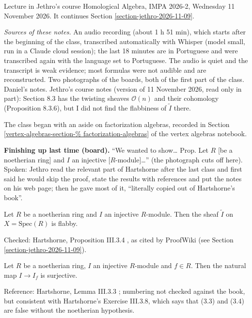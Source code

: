 \medskip
Lecture in Jethro's course Homological
Algebra, IMPA 2026-2, Wednesday 11 November
2026. It continues Section
\ref{section-jethro-2026-11-09}.

\textit{Sources of these notes.} An audio
recording (about 1 h 51 min), which starts
after the beginning of the class,
transcribed automatically with Whisper
(model small, run in a Claude cloud
session); the last 18 minutes are in
Portuguese and were transcribed again with
the language set to Portuguese. The audio
is quiet and the transcript is weak
evidence; most formulas were not audible
and are reconstructed. Two photographs of
the boards, both of the first part of the
class. Daniel's notes. Jethro's course notes
\cite{vanEkerenHomologicalAlgebra2026}
(version of 11 November 2026, read only in
part): Section 8.3 has the twisting sheaves
$\mathcal{O}(n)$ and their cohomology
(Proposition 8.3.6), but I did not find the
flabbiness of $\widetilde{I}$ there.

The class began with an aside on
factorization algebras, recorded in Section
\ref{vertex-algebras-section-%
factorization-algebras}
of the vertex algebras notebook.

\medskip\noindent
{\bf Finishing up last time (board).} ``We
wanted to show\ldots{} Prop. Let $R$ [be a
noetherian ring] and $I$ an injective
[$R$-module]\ldots'' (the photograph cuts
off here). Spoken: Jethro read the relevant
part of Hartshorne \cite{har} after the last
class and first said he would skip the
proof, state the results with references
and put the notes on his web page; then he
gave most of it, ``literally copied out of
Hartshorne's book''.

\begin{proposition}
\label{proposition-jethro-2026-11-11-flabby}
Let $R$ be a noetherian ring and $I$ an
injective $R$-module. Then the sheaf
$\widetilde{I}$ on
$X=\mathrm{Spec}(R)$ is flabby.
\end{proposition}

\noindent
Checked: Hartshorne, Proposition III.3.4
\cite{har}, as cited by ProofWiki (see
Section \ref{section-jethro-2026-11-09}).

\begin{lemma}
\label{lemma-jethro-2026-11-11-localization}
Let $R$ be a noetherian ring, $I$ an
injective $R$-module and $f\in R$. Then the
natural map $I\to I_f$ is surjective.
\end{lemma}

\noindent
Reference: Hartshorne, Lemma III.3.3
\cite{har}; numbering not checked against
the book, but consistent with Hartshorne's
Exercise III.3.8, which says that (3.3) and
(3.4) are false without the noetherian
hypothesis.

